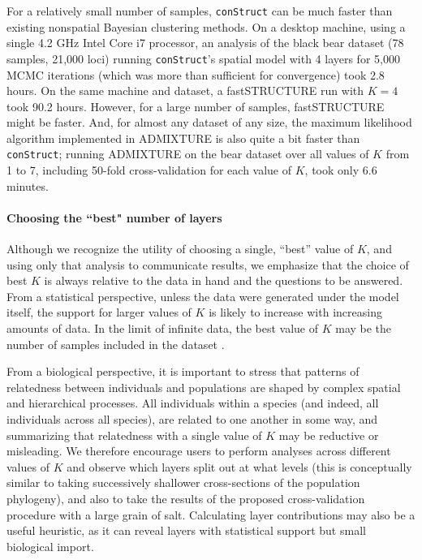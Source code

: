 \documentclass[10pt,letterpaper]{article}
\begin{document}
For a relatively small number of samples, 
\texttt{conStruct} can be much faster than existing nonspatial Bayesian clustering methods.
On a desktop machine, using a single 4.2 GHz Intel Core i7 processor, 
an analysis of the black bear dataset (78 samples, 21,000 loci) 
running \texttt{conStruct}'s spatial model with 4 layers for 5,000 MCMC iterations 
(which was more than sufficient for convergence) 
took 2.8 hours.
On the same machine and dataset, 
a fastSTRUCTURE \cite{fastStructure} run with $K=4$ took 90.2 hours.
However, for a large number of samples, 
fastSTRUCTURE might be faster.
And, for almost any dataset of any size, 
the maximum likelihood algorithm implemented in ADMIXTURE 
is also quite a bit faster than \texttt{conStruct}; 
running ADMIXTURE on the bear dataset over all values of $K$ from 1 to 7, 
including 50-fold cross-validation for each value of $K$, took only 6.6 minutes.


\paragraph{Choosing the ``best" number of layers}
Although we recognize the utility of choosing a single, ``best'' value of $K$, 
and using only that analysis to communicate results, 
we emphasize that 
the choice of best $K$ is always relative to the data in hand
and the questions to be answered.
From a statistical perspective, unless the data were generated under the model itself,
the support for larger values of $K$ is likely to increase with increasing amounts of data.
In the limit of infinite data, the best value of $K$ 
may be the number of samples included in the dataset \cite{Patterson2006}.

From a biological perspective, 
it is important to stress that patterns of relatedness between individuals and populations 
are shaped by complex spatial and hierarchical processes.
All individuals within a species (and indeed, all individuals across all species), 
are related to one another in some way, 
and summarizing that relatedness with a single value of $K$ may be reductive or misleading.
We therefore encourage users to perform analyses across different values of $K$ and 
observe which layers split out at what levels 
(this is conceptually similar to taking successively shallower
cross-sections of the population phylogeny), 
and also to take the results of the proposed cross-validation procedure with a large grain of salt.
Calculating layer contributions may also be a useful heuristic, 
as it can reveal layers with statistical support but small biological import.
\end{document}
